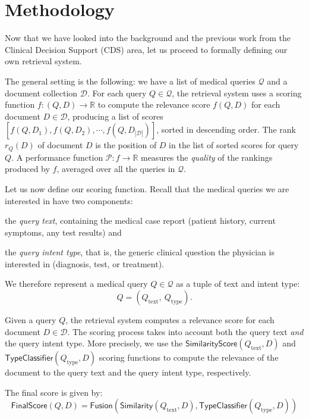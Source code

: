 \chapter{Methodology}

Now that we have looked into the background and the previous work from the Clinical Decision Support (CDS) area,
let us proceed to formally defining our own retrieval system. 

The general setting is the following: we have a list of medical queries $\mathcal{Q}$ and a document collection $\mathcal{D}$.
For each query $Q \in \mathcal{Q}$, 
the retrieval system uses a scoring function $f:(Q,D)\rightarrow\mathbb{R}$ to compute the relevance score $f(Q,D)$ 
for each
document $D\in\mathcal{D}$, producing a list of scores $[f(Q,D_1), f(Q,D_2), \cdots, f(Q,D_{|\mathcal{D}|})]$,
sorted in descending order.
The rank $r_Q(D)$ of document $D$ is the position of $D$ in the list of sorted scores for query $Q$.
A performance function $\mathcal{P}:f\rightarrow\mathbb{R}$ measures the \emph{quality} of the rankings produced by
$f$, averaged over all the queries in $ \mathcal{Q}$.

Let us now define our scoring function.
Recall that the medical queries we are interested in have two components:
\begin{enumerate*}[label=\arabic*)]
 \item the \emph{query text}, containing the medical case report (patient history, current symptoms, any test results) and
 \item the \emph{query intent type}, that is, the generic clinical question the physician is interested in (diagnosis, test, or treatment).
\end{enumerate*}
We therefore represent a medical query $Q\in\mathcal{Q}$ as a tuple of text and intent type: \[Q = \left(Q_{\text{text}},\ Q_{\text{type}}\right).\]

Given a query $Q$, the retrieval system computes a relevance score for each document $D\in\mathcal{D}$.
The scoring process takes into account both the query text \emph{and} the query intent type. More precisely, we use the
$\textsf{SimilarityScore}(Q_{\text{text}}, D)$ and $\textsf{TypeClassifier}(Q_{\text{type}}, D)$ scoring functions to compute the relevance of the document to the query text and the
query intent type, respectively.

The final score is given by:
\begin{equation}\label{fusion}
  \textsf{FinalScore}(Q, D) = \textsf{Fusion}\left(\textsf{Similarity}(Q_{\text{text}}, D), \textsf{TypeClassifier}(Q_{\text{type}}, D)\right)
\end{equation}

